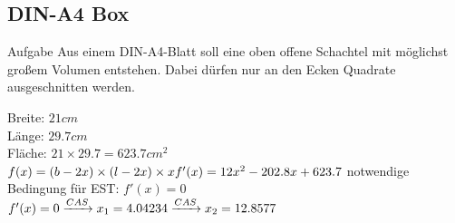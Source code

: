 \documentclass[arbeitsmappe.tex]{subfiles}
\begin{document}
    \subsection{DIN-A4 Box}

    \begin{rblock}{Aufgabe}
        Aus einem DIN-A4-Blatt soll eine oben offene Schachtel mit möglichst großem Volumen entstehen.
        Dabei dürfen nur an den Ecken Quadrate ausgeschnitten werden.
    \end{rblock}

    Breite: $21cm$ \\
    Länge: $29.7cm$ \\
    Fläche: $21 \times 29.7 = 623.7cm^2$ \\

    $
    f(x) = (b - 2x) \times (l - 2x) \times x \\
    f'(x) = 12x^2 - 202.8x + 623.7 \\
    $
    notwendige Bedingung für EST: $f'(x) = 0$ \\
    $
    f'(x) = 0 \\
    \xrightarrow{CAS} x_1 = 4.04234 \\
    \xrightarrow{CAS} x_2 = 12.8577 \\
    $
\end{document}
